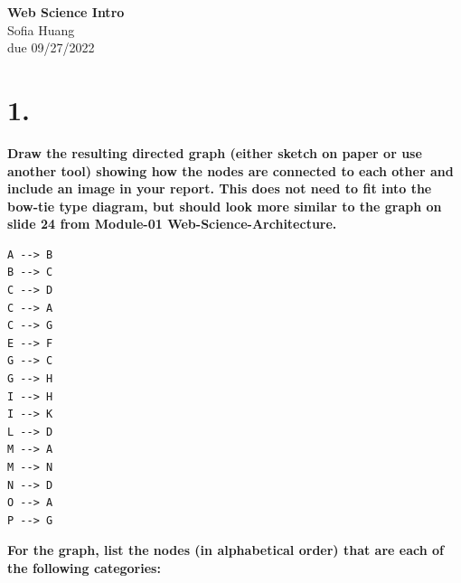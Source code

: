 \documentclass[12pt]{article}
\begin{document}
\begin{centering}
{\large\textbf{Web Science Intro}}\\ 
Sofia Huang\\
due 09/27/2022\\
\end{centering}


\section*{1.}

\noindent \textbf{Draw the resulting directed graph (either sketch on paper or use another tool) showing how the nodes are connected to each other and include an image in your report. This does not need to fit into the bow-tie type diagram, but should look more similar to the graph on slide 24 from Module-01 Web-Science-Architecture.\\}

\begin{lstlisting}
A --> B
B --> C
C --> D
C --> A
C --> G
E --> F
G --> C
G --> H
I --> H
I --> K
L --> D
M --> A
M --> N
N --> D
O --> A
P --> G 
\end{lstlisting}

\noindent \textbf{For the graph, list the nodes (in alphabetical order) that are each of the following categories:}
\clearpage 
\end{document}
